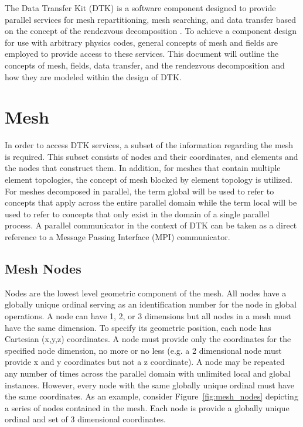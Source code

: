 \documentclass[letterpaper,12pt]{article}
\begin{document}
The Data Transfer Kit (DTK) is a software component designed to
provide parallel services for mesh repartitioning, mesh searching, and
data transfer based on the concept of the rendezvous decomposition
\cite{Plimpton_2004}. To achieve a component design for use with
arbitrary physics codes, general concepts of mesh and fields are
employed to provide access to these services. This document will
outline the concepts of mesh, fields, data transfer, and the
rendezvous decomposition and how they are modeled within the design of
DTK.

\clearpage

\section{Mesh}\label{sec:mesh}
In order to access DTK services, a subset of the information regarding
the mesh is required. This subset consists of nodes and their
coordinates, and elements and the nodes that construct them. In
addition, for meshes that contain multiple element topologies, the
concept of mesh blocked by element topology is utilized. For meshes
decomposed in parallel, the term global will be used to refer to
concepts that apply across the entire parallel domain while the term
local will be used to refer to concepts that only exist in the domain
of a single parallel process. A parallel communicator in the context
of DTK can be taken as a direct reference to a Message Passing
Interface (MPI) communicator.

\subsection{Mesh Nodes}\label{subsec:nodes}
Nodes are the lowest level geometric component of the mesh. All nodes
have a globally unique ordinal serving as an identification number for
the node in global operations. A node can have 1, 2, or 3 dimensions
but all nodes in a mesh must have the same dimension. To specify its
geometric position, each node has Cartesian (x,y,z) coordinates. A
node must provide only the coordinates for the specified node
dimension, no more or no less (e.g. a 2 dimensional node must provide
x and y coordinates but not a z coordinate). A node may be repeated
any number of times across the parallel domain with unlimited local
and global instances. However, every node with the same globally
unique ordinal must have the same coordinates. As an example, consider
Figure~\ref{fig:mesh_nodes} depicting a series of nodes contained in
the mesh. Each node is provide a globally unique ordinal and set of 3
dimensional coordinates.
\end{document}
